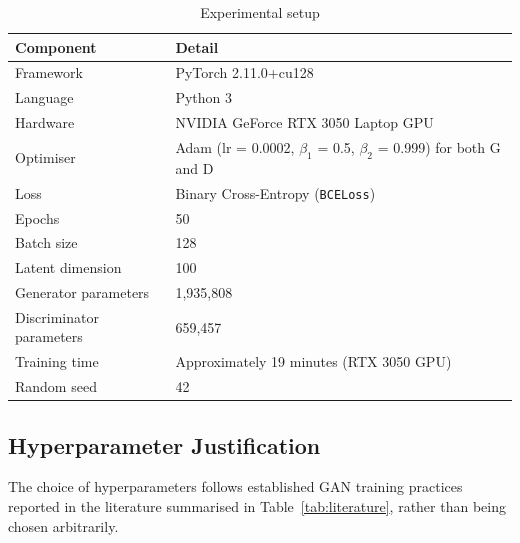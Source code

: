 \documentclass[12pt,a4paper]{article}
\begin{document}
\begin{table}[H]
    \begin{center}
        \begin{tabular}{|l|l|}
            \hline
            \textbf{Component} & \textbf{Detail} \\
            \hline
            Framework & PyTorch 2.11.0+cu128 \\
            \hline
            Language & Python 3 \\
            \hline
            Hardware & NVIDIA GeForce RTX 3050 Laptop GPU \\
            \hline
            Optimiser & Adam (lr = 0.0002, $\beta_1$ = 0.5, $\beta_2$ = 0.999) for both G and D \\
            \hline
            Loss & Binary Cross-Entropy (\texttt{BCELoss}) \\
            \hline
            Epochs & 50 \\
            \hline
            Batch size & 128 \\
            \hline
            Latent dimension & 100 \\
            \hline
            Generator parameters & 1,935,808 \\
            \hline
            Discriminator parameters & 659,457 \\
            \hline
            Training time & Approximately 19 minutes (RTX 3050 GPU) \\
            \hline
            Random seed & 42 \\
            \hline
        \end{tabular}
        \caption{Experimental setup}
        \label{tab:setup}
    \end{center}
\end{table}

\subsection{Hyperparameter Justification}

The choice of hyperparameters follows established GAN training practices reported in the
literature summarised in Table~\ref{tab:literature}, rather than being chosen arbitrarily.
\end{document}
